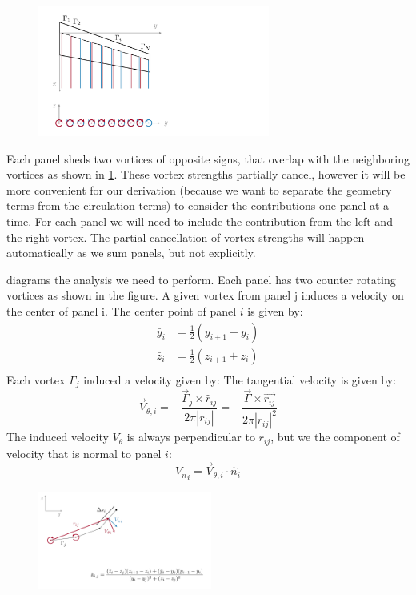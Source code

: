 \documentclass{article}
\begin{document}
\begin{figure}[htbp]
\centering
\includegraphics[width=3.0in]{figs/vlmwake}
\caption{}
\label{fig:vlmwake}
\end{figure}

Each panel sheds two vortices of opposite signs, that overlap with the neighboring vortices as shown in \cref{fig:vlmwake}.  These vortex strengths partially cancel, however it will be more convenient for our derivation (because we want to separate the geometry terms from the circulation terms) to consider the contributions one panel at a time.  For each panel we will need to include the contribution from the left and the right vortex.  The partial cancellation of vortex strengths will happen automatically as we sum panels, but not explicitly.  

 diagrams the analysis we need to perform.  Each panel has two counter rotating vortices as shown in the figure.  A given vortex from panel j induces a velocity on the center of  panel i. The center point of panel $i$ is given by:
\begin{align}
\bar{y}_i &= \frac{1}{2} (y_{i+1} + y_i)\\
\bar{z}_i &= \frac{1}{2} (z_{i+1} + z_i)\\
\end{align}
Each vortex $\Gamma_j$ induced a velocity given by:
The tangential velocity is given by:
\begin{equation}
\vec{V}_{\theta, i} = - \frac{\vec\Gamma_j \times \hat{r}_{ij}}{2 \pi |r_{ij}|} = - \frac{\vec\Gamma \times \vec{r_{ij}}}{2 \pi |r_{ij}|^2}
\end{equation}
The induced velocity $V_\theta$ is always perpendicular to $r_{ij}$, but we the component of velocity that is normal to panel $i$:
\begin{equation}
{V_n}_i = \vec{V}_{\theta, i} \cdot \hat{n}_i
\end{equation}

\begin{figure}[htbp]
\centering
\includegraphics[width=2.25in]{figs/induced}
\caption{}
\label{fig:induced}
\end{figure}
\end{document}
